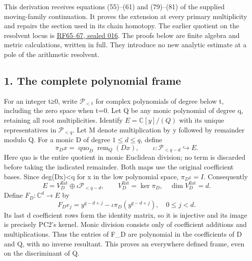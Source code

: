 \documentclass[11pt]{article}
\begin{document}
This derivation receives equations (55)--(61) and (79)--(81) of the supplied moving-family continuation. It proves the extension at every primary multiplicity and repairs the section used in its chain homotopy. The earlier quotient on the resolvent locus is \href{https://github.com/KokunoYumeto/zeta-function-research-reader/blob/d44d94aa43d0a1934455ddac008368583f43a2c1/workbenches/splitzero-tandem/continuations/20260921-canonical-memory-filters/RATIONAL_FILTER_PROOFS.md}{RF65--67, sealed 016}. The proofs below are finite algebra and metric calculations, written in full. They introduce no new analytic estimate at a pole of the arithmetic resolvent.

\subsection{1. The complete polynomial frame}\label{the-complete-polynomial-frame}

For an integer t≥0, write \(\mathcal P_{<t}\) for complex polynomials of degree below t, including the zero space when t=0. Let Q be any monic polynomial of degree q, retaining all root multiplicities. Identify \(E=\mathbb C[y]/(Q)\) with its unique representatives in \(\mathcal P_{<q}\). Let M denote multiplication by y followed by remainder modulo Q. For a monic D of degree \(1\le d\le q\), define \[
\pi_D x=\operatorname{quo}_D\operatorname{rem}_Q(Dx),\qquad
\iota:\mathcal P_{<q-d}\hookrightarrow E.
\tag{PC1}
\] Here quo is the entire quotient in monic Euclidean division; no term is discarded before taking the indicated remainder. Both maps use the original coefficient bases. Since deg(Dx)\textless q for x in the low polynomial space, \(\pi_D\iota=I\). Consequently \[
E=V_D^{\mathrm{flat}}\oplus\iota\mathcal P_{<q-d},\qquad
V_D^{\mathrm{flat}}=\ker\pi_D,
\quad\dim V_D^{\mathrm{flat}}=d.
\tag{PC2}
\] Define \(F_D:\mathbb C^d\to E\) by \[
F_De_j=y^{q-d+j}-\iota\pi_D(y^{q-d+j}),\quad 0\le j<d.
\tag{PC3}
\] Its last d coefficient rows form the identity matrix, so it is injective and its image is precisely PC2's kernel. Monic division consists only of coefficient additions and multiplications. Thus the entries of F\_D are polynomial in the coefficients of D and Q, with no inverse resultant. This proves an everywhere defined frame, even on the discriminant of Q.
\end{document}
